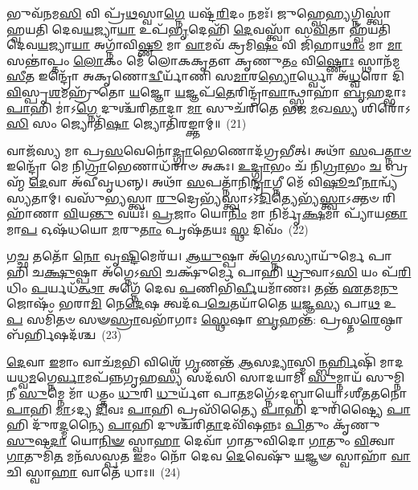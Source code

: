 {\anuvakamend[{\-\ul{𑌬𑌾}\-𑌹𑍁𑌰᳴𑌸𑌿 \ul{𑌪𑍍𑌰𑌿}\-𑌯𑍇 𑌸𑌦᳴𑌸𑌿 𑌪𑌞𑍍𑌚᳴𑌦𑌶 𑌚}]}

𑌭𑍁𑌵᳴𑌨𑌮\-\ul{𑌸𑌿} 𑌵𑌿 𑌪𑍍𑌰᳴\-\ul{𑌥}\-𑌸𑍍𑌵𑌾\-\ul{𑌗𑍍𑌨𑍇} 𑌯𑌷𑍍𑌟᳴\-\ul{𑌰𑌿}\-𑌦𑌂 𑌨𑌮𑌃᳴। 𑌜𑍁𑌹𑍍𑌵𑍇\-\ul{𑌹𑍍𑌯}\-𑌗𑍍𑌨𑌿𑌸𑍍𑌤𑍍𑌵𑌾॑ 𑌹𑍍𑌵𑌯𑌤𑌿 𑌦𑍇𑌵\-\ul{𑌯}\-𑌜𑍍𑌯𑌾\-\ul{𑌯𑌾} 𑌉𑌪᳴\-\ul{𑌭𑍃}\-𑌦𑍇𑌹𑌿᳴ \ul{𑌦𑍇}\-𑌵𑌸𑍍𑌤𑍍𑌵𑌾᳴ 𑌸\-\ul{𑌵𑌿}\-𑌤𑌾 𑌹𑍍𑌵᳴𑌯𑌤𑌿 𑌦𑍇𑌵\-\ul{𑌯}\-𑌜𑍍𑌯𑌾\-\ul{𑌯𑌾} 𑌅𑌗𑍍𑌨𑌾᳴𑌵𑌿\-\ul{𑌷𑍍𑌣𑍂} 𑌮𑌾 \ul{𑌵𑌾}\-𑌮𑌵᳴ 𑌕𑍍𑌰𑌮𑌿\-\ul{𑌷𑌂} 𑌵𑌿 𑌜𑌿᳴𑌹𑌾\-\ul{𑌥𑌾𑌂} 𑌮𑌾 \ul{𑌮𑌾} 𑌸𑌨𑍍𑌤𑌾॑𑌪𑍍𑌤𑌂 \ul{𑌲𑍋}\-𑌕𑌂 𑌮𑍇᳴ 𑌲𑍋𑌕𑌕𑍃𑌤𑍗 𑌕𑍃𑌣𑍁\-\ul{𑌤𑌂} 𑌵𑌿\-\ul{𑌷𑍍𑌣𑍋𑌃} 𑌸𑍍𑌥𑌾𑌨᳴𑌮\-\ul{𑌸𑍀}\-𑌤 𑌇𑌨𑍍𑌦𑍍𑌰𑍋᳴ 𑌅𑌕𑍃𑌣𑍋\-\ul{𑌦𑍍𑌵𑍀}\-𑌰𑍍𑌯𑌾᳴𑌣𑌿 𑌸\-\ul{𑌮𑌾}\-𑌰\-\ul{𑌭𑍍𑌯𑍋}\-𑌰𑍍𑌧𑍍𑌵𑍋 𑌅᳴\-\ul{𑌧𑍍𑌵}\-𑌰𑍋 𑌦𑌿᳴\-\ul{𑌵𑌿}\-𑌸𑍍𑌪𑍃\-\ul{𑌶}\-𑌮𑌹𑍍𑌰𑍁᳴𑌤𑍋 \ul{𑌯}\-𑌜𑍍𑌞𑍋 \ul{𑌯}\-𑌜𑍍𑌞𑌪᳴\-\ul{𑌤𑍇}\-𑌰𑌿𑌨𑍍𑌦𑍍𑌰𑌾᳴\-\ul{𑌵𑌾}\-𑌨𑍍𑌥𑍍𑌸𑍍𑌵𑌾𑌹𑌾᳴ \ul{𑌬𑍃}\-𑌹𑌦𑍍𑌭𑌾𑌃 \ul{𑌪𑌾}\-𑌹𑌿 𑌮𑌾॑𑌽\-\ul{𑌗𑍍𑌨𑍇} 𑌦𑍁𑌶𑍍𑌚᳴𑌰𑌿\-\ul{𑌤𑌾}\-𑌦𑌾 \ul{𑌮𑌾} 𑌸𑍁𑌚᳴𑌰𑌿𑌤𑍇 𑌭𑌜 \ul{𑌮}\-𑌖\-\ul{𑌸𑍍𑌯} 𑌶𑌿𑌰𑍋᳴\-𑌽\-\ul{𑌸𑌿} 𑌸𑌂 𑌜𑍍𑌯𑍋𑌤𑌿᳴\-\ul{𑌷𑌾} 𑌜𑍍𑌯𑍋𑌤𑌿᳴𑌰𑌙𑍍𑌕𑍍𑌤𑌾𑌮𑍍॥~(21)

{\anuvakamend[{𑌅𑌹𑍍𑌰𑍁᳴\-\ul{𑌤} 𑌏𑌕᳴𑌵𑌿𑍞𑌶𑌤𑌿𑌶𑍍𑌚}]}

𑌵𑌾𑌜᳴𑌸𑍍𑌯 𑌮𑌾 𑌪𑍍𑌰\-\ul{𑌸}\-𑌵𑍇𑌨𑍋॑\-\ul{𑌦𑍍𑌗𑍍𑌰𑌾}\-𑌭𑍇𑌣𑍋𑌦᳴𑌗𑍍𑌰𑌭𑍀𑌤𑍍। 𑌅𑌥𑌾᳴ \ul{𑌸}\-𑌪\-\ul{𑌤𑍍𑌨𑌾}\-\-\ul{𑍞} 𑌇𑌨𑍍𑌦𑍍𑌰𑍋᳴ 𑌮𑍇 𑌨𑌿\-\ul{𑌗𑍍𑌰𑌾}\-𑌭𑍇𑌣𑌾𑌧᳴𑌰𑌾𑍞 𑌅𑌕𑌃। \ul{𑌉}\-\-\ul{𑌦𑍍𑌗𑍍𑌰𑌾}\-𑌭𑌂 𑌚᳴ 𑌨𑌿\-\ul{𑌗𑍍𑌰𑌾}\-𑌭𑌂 \ul{𑌚} 𑌬𑍍𑌰𑌹𑍍𑌮᳴ \ul{𑌦𑍇}\-𑌵𑌾 𑌅᳴𑌵𑍀𑌵𑍃𑌧𑌨𑍍𑌨𑍍। 𑌅𑌥𑌾᳴ \ul{𑌸}\-𑌪𑌤𑍍𑌨𑌾᳴𑌨𑌿\-\ul{𑌨𑍍𑌦𑍍𑌰𑌾}\-𑌗𑍍𑌨𑍀 𑌮𑍇᳴ 𑌵𑌿\-\ul{𑌷𑍂}\-𑌚𑍀\-\ul{𑌨𑌾}\-𑌨𑍍𑌵𑍍𑌯᳴𑌸𑍍𑌯𑌤𑌾𑌮𑍍। 𑌵𑌸𑍁᳴𑌭𑍍𑌯𑌸𑍍𑌤𑍍𑌵𑌾 \ul{𑌰𑍁}\-𑌦𑍍𑌰𑍇𑌭𑍍𑌯᳴𑌸𑍍𑌤𑍍𑌵𑌾\-𑌽\-𑌽\-\ul{𑌦𑌿}\-𑌤𑍍𑌯𑍇𑌭𑍍𑌯᳴\-\ul{𑌸𑍍𑌤𑍍𑌵𑌾}\-𑌽𑌕𑍍𑌤𑍞 𑌰𑌿𑌹𑌾᳴𑌣𑌾 \ul{𑌵𑌿}\-𑌯\-\ul{𑌨𑍍𑌤𑍁} 𑌵𑌯𑌃᳴। \ul{𑌪𑍍𑌰}\-𑌜𑌾𑌂 𑌯𑍋\-\ul{𑌨𑌿𑌂} 𑌮𑌾 𑌨𑌿𑌰𑍍𑌮𑍃᳴\-\ul{𑌕𑍍𑌷}\-𑌮𑌾 𑌪𑍍𑌯𑌾᳴𑌯\-\ul{𑌨𑍍𑌤𑌾}\-𑌮𑌾\-\ul{𑌪} 𑌓𑌷᳴𑌧𑌯𑍋 \ul{𑌮}\-𑌰𑍁\-\ul{𑌤𑌾𑌂} 𑌪𑍃𑌷᳴𑌤𑌯𑌃 \ul{𑌸𑍍𑌥} 𑌦𑌿𑌵𑌂᳴~(22)

𑌗\-\ul{𑌚𑍍𑌛} 𑌤𑌤𑍋᳴ \ul{𑌨𑍋} 𑌵𑍃\-\ul{𑌷𑍍𑌟𑌿}\-𑌮𑍇𑌰᳴𑌯। \ul{𑌆}\-\-\ul{𑌯𑍁}\-𑌷𑍍𑌪𑌾 𑌅᳴\-\ul{𑌗𑍍𑌨𑍇}\-\-𑌽𑌸𑍍𑌯𑌾𑌯𑍁᳴𑌰𑍍𑌮𑍇 𑌪𑌾𑌹𑌿 𑌚\-\ul{𑌕𑍍𑌷𑍁}\-𑌷𑍍𑌪𑌾 𑌅᳴𑌗𑍍𑌨𑍇\-𑌽\-\ul{𑌸𑌿} 𑌚𑌕𑍍𑌷𑍁᳴𑌰𑍍𑌮𑍇 𑌪𑌾𑌹𑌿 \ul{𑌧𑍍𑌰𑍁}\-𑌵𑌾\-𑌽\-\ul{𑌸𑌿} 𑌯𑌂 𑌪᳴\-\ul{𑌰𑌿}\-𑌧𑌿𑌂 \ul{𑌪}\-𑌰𑍍𑌯𑌧᳴\-\ul{𑌤𑍍𑌥𑌾} 𑌅𑌗𑍍𑌨𑍇᳴ 𑌦𑍇𑌵 \ul{𑌪}\-𑌣𑌿𑌭𑌿᳴\-\ul{𑌰𑍍𑌵𑍀}\-𑌯𑌮𑌾᳴𑌣𑌃। 𑌤𑌨𑍍𑌤᳴ \ul{𑌏}\-𑌤𑌮\-\ul{𑌨𑍁} 𑌜𑍋𑌷𑌂᳴ 𑌭𑌰𑌾\-\ul{𑌮𑌿} 𑌨𑍇\-\ul{𑌦𑍇}\-𑌷 𑌤𑍍𑌵𑌦᳴𑌪\-\ul{𑌚𑍇}\-𑌤𑌯𑌾᳴𑌤𑍈 \ul{𑌯}\-𑌜𑍍𑌞\-\ul{𑌸𑍍𑌯} 𑌪𑌾\-\ul{𑌥} 𑌉\-\ul{𑌪} 𑌸𑌮𑌿᳴𑌤𑍞 𑌸𑍟\-\ul{𑌸𑍍𑌰𑌾}\-𑌵𑌭𑌾᳴𑌗𑌾𑌃 \ul{𑌸𑍍𑌥𑍇}\-𑌷𑌾 \ul{𑌬𑍃}\-𑌹𑌨𑍍𑌤᳴: 𑌪𑍍𑌰𑌸𑍍𑌤\-\ul{𑌰𑍇}\-𑌷𑍍𑌠𑌾 𑌬᳴𑌰𑍍\mbox{}\-\ul{𑌹𑌿}\-𑌷𑌦᳴𑌶𑍍𑌚~(23)

\-\ul{𑌦𑍇}\-𑌵𑌾 \ul{𑌇}\-𑌮𑌾𑌂 𑌵𑌾𑌚᳴\-\ul{𑌮}\-𑌭𑌿 𑌵𑌿𑌶𑍍𑌵𑍇᳴ \ul{𑌗𑍃}\-𑌣𑌨𑍍𑌤᳴ \ul{𑌆}\-𑌸\-\ul{𑌦𑍍𑌯𑌾}\-𑌸𑍍𑌮𑌿\-\ul{𑌨𑍍𑌬}\-\-\ul{𑌰𑍍}\-𑌹𑌿𑌷𑌿᳴ 𑌮𑌾𑌦𑌯𑌧𑍍𑌵\-\ul{𑌮}\-𑌗𑍍𑌨𑍇\-\ul{𑌰𑍍𑌵𑌾}\-𑌮𑌪᳴𑌨𑍍𑌨𑌗𑍃𑌹\-\ul{𑌸𑍍𑌯} 𑌸𑌦᳴𑌸𑌿 𑌸𑌾𑌦𑌯𑌾𑌮𑌿 \ul{𑌸𑍁}\-𑌮𑍍𑌨𑌾𑌯᳴ 𑌸𑍁𑌮𑍍𑌨𑌿𑌨𑍀 \ul{𑌸𑍁}\-𑌮𑍍𑌨𑍇 𑌮𑌾᳴ 𑌧𑌤𑍍𑌤𑌂 \ul{𑌧𑍁}\-𑌰𑌿 \ul{𑌧𑍁}\-𑌰𑍍𑌯𑍗᳴ 𑌪𑌾\-\ul{𑌤}\-𑌮𑌗𑍍𑌨𑍇᳴\-𑌽𑌦𑌬𑍍𑌧𑌾𑌯𑍋\-𑌽𑌶𑍀𑌤𑌤𑌨𑍋 \ul{𑌪𑌾}\-𑌹𑌿 \ul{𑌮𑌾}\-\-𑌽𑌦𑍍𑌯 \ul{𑌦𑌿}\-𑌵𑌃 \ul{𑌪𑌾}\-𑌹𑌿 𑌪𑍍𑌰𑌸𑌿᳴𑌤𑍍𑌯𑍈 \ul{𑌪𑌾}\-𑌹𑌿 𑌦𑍁𑌰𑌿᳴𑌷𑍍𑌟𑍍𑌯𑍈 \ul{𑌪𑌾}\-𑌹𑌿 𑌦𑍁᳴𑌰\-\ul{𑌦𑍍𑌮}\-𑌨𑍍𑌯𑍈 \ul{𑌪𑌾}\-𑌹𑌿 𑌦𑍁𑌶𑍍𑌚᳴𑌰𑌿\-\ul{𑌤𑌾}\-𑌦𑌵𑌿᳴𑌷𑌨𑍍𑌨𑌃 \ul{𑌪𑌿}\-𑌤𑍁𑌂 𑌕𑍃᳴𑌣𑍁 \ul{𑌸𑍁}\-𑌷\-\ul{𑌦𑌾} 𑌯𑍋\-\ul{𑌨𑌿}\-\-\ul{𑍟} 𑌸𑍍𑌵𑌾\-\ul{𑌹𑌾} 𑌦𑍇𑌵𑌾᳴ 𑌗𑌾𑌤𑍁𑌵𑌿𑌦𑍋 \ul{𑌗𑌾}\-𑌤𑍁𑌂 \ul{𑌵𑌿}\-𑌤𑍍𑌵𑌾 \ul{𑌗𑌾}\-𑌤𑍁𑌮𑌿᳴\-\ul{𑌤} 𑌮𑌨᳴𑌸𑌸𑍍𑌪𑌤 \ul{𑌇}\-𑌮𑌂 𑌨𑍋᳴ 𑌦𑍇𑌵 \ul{𑌦𑍇}\-𑌵𑍇𑌷𑍁᳴ \ul{𑌯}\-𑌜𑍍𑌞𑍟 𑌸𑍍𑌵𑌾𑌹𑌾᳴ \ul{𑌵𑌾}\-𑌚𑌿 𑌸𑍍𑌵𑌾\-\ul{𑌹𑌾} 𑌵𑌾𑌤𑍇᳴ 𑌧𑌾𑌃॥~(24)

